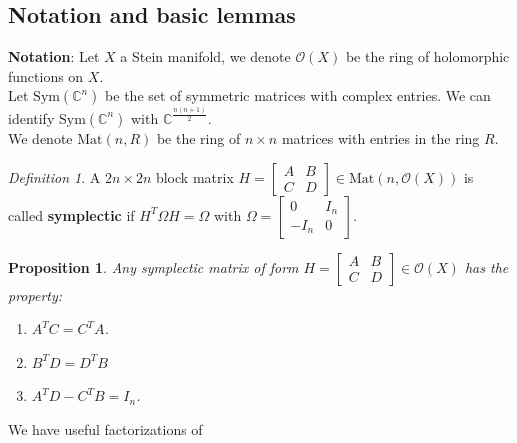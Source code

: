 \documentclass[10pt]{amsart}
\newtheorem{prop}[theo]{Proposition}
\theoremstyle{remark}
\newtheorem{defi}[theo]{Definition}
\begin{document}
\subsection{Notation and basic lemmas}
\textbf{Notation}: Let $X$ a Stein manifold, we denote $\mathcal{O}(X)$ be the ring of holomorphic functions on $X$.\\
Let $\mathrm{Sym}(\mathbb{C}^n)$ be the set of symmetric matrices with complex entries. We can identify $\mathrm{Sym}(\mathbb{C}^n)$ with $\mathbb{C}^{\frac{n(n+1)}{2}}$. \\
We denote $\mathrm{Mat}(n,R)$ be the ring of $n \times n$ matrices with entries in the ring $R$. 
\begin{defi}
A $2n \times 2n$ block matrix $H = \left[\begin{array}{ccc} A & B \\ C & D\end{array}\right] \in \mathrm{Mat}(n,\mathcal{O}(X))$ is called \textbf{symplectic} if  $H^T\Omega H = \Omega$ with $\Omega =  \left[\begin{array}{ccc} 0 & I_n \\ -I_n & 0\end{array}\right]$.
\end{defi}
\begin{prop}\label{fact}
Any symplectic matrix of form $H = \left[\begin{array}{ccc} A & B \\ C & D\end{array}\right] \in \mathcal{O}(X)$ has the property:
\begin{enumerate}
    \item $A^TC = C^TA$.
    \item $B^TD=D^TB$
    \item $A^TD-C^TB = I_n$.
\end{enumerate}
\end{prop}
We have useful factorizations of  
\end{document}
